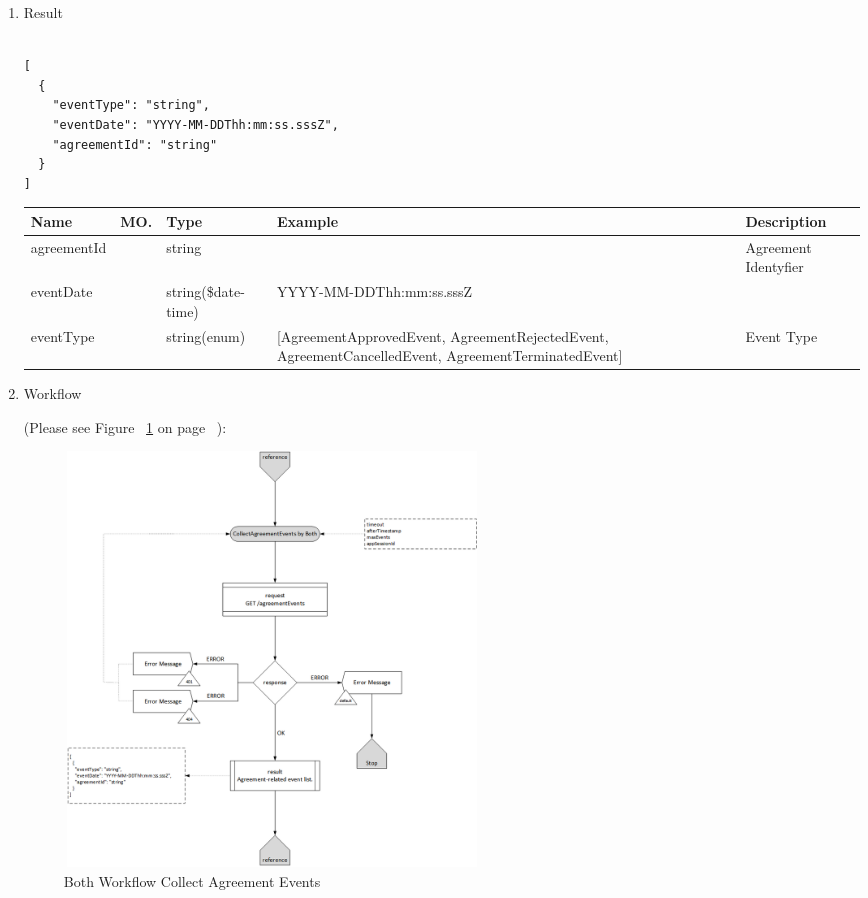 \begin{enumerate}
\item Result

\begin{tcolorbox}[boxrule=0pt, frame empty]
\begin{verbatim}

[
  {
    "eventType": "string",
    "eventDate": "YYYY-MM-DDThh:mm:ss.sssZ",
    "agreementId": "string"
  }
]

\end{verbatim}
\end{tcolorbox}

\begin{table}[H]
\footnotesize

\begin{center}
\begin{tabular}{|p{3cm}|l|p{3cm}|p{3cm}|p{4cm}|} 
\hline
\rowcolor{lightgray}	Name	& MO.	& Type	& Example & 	Description \\
\hline

agreementId		& 	& 	string				&						&	Agreement Identyfier \\ 
\hline

eventDate		& 	& 	string(\$date-time)	&	YYYY-MM-DDThh:mm:ss.sssZ	&	 \\ 
\hline

eventType		& 	& 	string(enum)		&	[AgreementApprovedEvent, AgreementRejectedEvent, AgreementCancelledEvent, AgreementTerminatedEvent] &	Event Type \\ 
\hline

\end{tabular}
\end{center}

\end{table}

\item Workflow

(Please see Figure ~\ref{fig:CAE} on page ~\pageref{fig:CAE}):

\begin{figure}[H]
    \centering
    \includegraphics[width=11cm,height=11cm,angle=0]{./diag/Workflow/Market/CollectAgreementEvents-B-Workflow.png}
    \caption{Both Workflow Collect Agreement Events }
	\label{fig:CAE}
\end{figure}


\end{enumerate}
